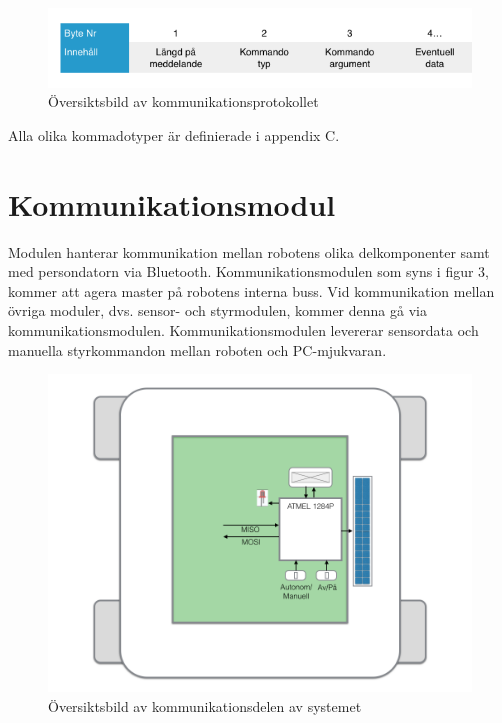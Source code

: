 \documentclass[a4paper,12pt,fleqn]{article}
\begin{document}
\begin{figure}[htp] %
  \begin{center}
  \includegraphics[keepaspectratio=true,width=0.5\linewidth]{bilder/Bussprotokoll.png}  %
  \end{center}
  \caption{Översiktsbild av kommunikationsprotokollet} %
  \label{fig:bussprotocol}
\end{figure}

Alla olika kommadotyper är definierade i appendix C.




\section{Kommunikationsmodul}
Modulen hanterar kommunikation mellan robotens olika delkomponenter samt med persondatorn via Bluetooth. Kommunikationsmodulen som syns i figur 3, kommer att agera master på robotens interna buss. Vid kommunikation mellan övriga moduler, dvs. sensor- och styrmodulen, kommer denna gå via kommunikationsmodulen. Kommunikationsmodulen levererar sensordata och manuella styrkommandon mellan roboten och PC-mjukvaran.

\begin{figure}[htp] %
  \begin{center}
  \includegraphics[keepaspectratio=true,width=\linewidth]{bilder/kom_overview.png}  %
  \end{center}
  \caption{Översiktsbild av kommunikationsdelen av systemet} %
  \label{fig:overviewKom}
\end{figure}
\newpage
\end{document}
